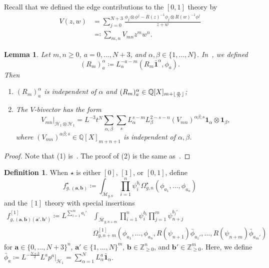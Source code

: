 \documentclass[10pt]{amsart}
\DeclarePairedDelimiter{\floor}{\lfloor}{\rfloor}
\newtheorem{lem}[thm]{Lemma}
\theoremstyle{definition}
\newtheorem{defn}[thm]{Definition}
\theoremstyle{remark}
\theoremstyle{plain}
\theoremstyle{definition}
\theoremstyle{remark}
\newcommand{\Z}{\mathbb{Z}}
\newcommand{\Q}{\mathbb{Q}}
\newcommand{\ba}{\mathbf{a}}
\newcommand{\bb}{\mathbf{b}}
\newcommand{\msc}[1]{\mathscr{#1}}
\newcommand{\ol}[1]{\overline{#1}}
\newcommand{\1}{\mathbf{1}}
\newcommand{\2}{\mathbf{2}}
\newcommand{\3}{\mathbf{3}}
\numberwithin{equation}{section}
\begin{document}
Recall that we defined the edge contributions to the $[0,1]$ theory by
\begin{align*}
    V(z,w) &= \sum_{j=0}^{N+3} \frac{\phi_j \otimes \phi^j - R(z)^{-1}\phi_j \otimes R(w)^{-1}\phi^j}{z+w} \\ 
    &\eqqcolon \sum_{m,n} V_{mn} z^m w^n.
\end{align*}

\begin{lem}\label{lem:rlevel1}
    Let $m,n \geq 0$, $a = 0,\ldots, N+3$, and $\alpha,\beta \in \{1,\ldots,N\}$. In~\cite[\S 5.3]{polynomiality}, we defined
    \[ (R_m)_a^{\alpha} \coloneqq L_{\alpha}^{-a-m} (R_m \bar{\1}^{\alpha},\phi_a). \] Then
    \begin{enumerate}
        \item $(R_m)_a^{\alpha}$ is independent of $\alpha$ and $(R_m)_a^{\alpha} \in \Q[X]_{m+\floor{\frac{a}{N}}}$;
        \item The $V$-bivector has the form
            \[ V_{mn} |_{\msc{H}_1 \otimes \msc{H}_1} = L^{-3} t^N \sum_{\alpha,\beta} \sum_s L_{\alpha}^{s-m} L_{\beta}^{2-s-n} (V_{mn})^{\alpha\beta;s} \1_{\alpha} \otimes \1_{\beta}, \]
            where $(V_{mn})^{\alpha\beta;s} \in \Q[X]_{m+n+1}$ is independent of $\alpha,\beta$.
    \end{enumerate}
\end{lem}

\begin{proof}
    Note that (1) is~\cite[Lemma 5.9]{polynomiality}. The proof of (2) is the same as~\cite[Lemma C.1]{nmsp2}.
\end{proof}

\begin{defn}
    When $\star$ is either $[0]$, $[1]$, or $[0,1]$, define
    \[ f^{\star}_{g,(\ba,\bb)} \coloneqq \int_{\ol{\msc{M}}_{g,n}} \prod_{i=1}^n \psi_i^{b_i} \Omega_{g,n}^{\star}(\phi_{a_1}, \ldots, \phi_{a_n}) \]
    and the $[1]$ theory with special insertions
    \begin{align*}
        f^{[1]}_{g,(\ba,\bb)(\ba',\bb')} \coloneqq L^{\sum_{i=1}^m a_i'}& \int_{\ol{\msc{M}}_{g,n+m}} \prod_{i=1}^n \psi_i^{b_i} \prod_{j=1}^m \psi_{n+j}^{b_j'} \\
        & \Omega_{g,n+m}^{[1]}(\phi_{a_1}, \ldots, \phi_{a_n}, R(\psi_{n+1}) \bar{\phi}_{a_1'},\ldots,R(\psi_{n+m}) \bar{\phi}_{a_m'})
    \end{align*}
    for $\ba \in \{0,\ldots,N+3\}^n$, $\ba' \in \{1,\ldots,N\}^m$, $\bb \in \Z_{\geq 0}^n$, and $\bb' \in \Z_{\geq 0}^m$. Here, we define $\bar{\phi}_a \coloneqq L^{-\frac{N+3}{2}} L^a p^a|_{\msc{H}_1} = \sum_{\alpha=1}^N L_{\alpha}^a \bar{\1}_{\alpha}$.
\end{defn}
\end{document}
